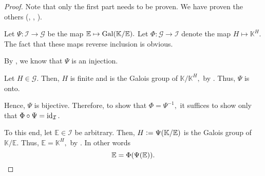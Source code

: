 \FTGT*\label{thm:FTGT2}
\begin{flushright}\hyperref[thm:FTGT]{\upsym}\end{flushright}
\begin{proof}
    Note that only the first part needs to be proven. We have proven the others (, , ).

    Let $\Psi : \mathcal{I} \to \mathcal{G}$ be the map $\mathbb{E} \mapsto \operatorname{Gal}(\mathbb{K}/\mathbb{E}).$ Let $\Phi : \mathcal{G} \to \mathcal{I}$ denote the map $H \mapsto \mathbb{K}^H.$ The fact that these maps reverse inclusion is obvious.

    By , we know that $\Psi$ is an injection.

    Let $H \in \mathcal{G}.$ Then, $H$ is finite and is the Galois group of $\mathbb{K}/\mathbb{K}^H,$ by . Thus, $\Psi$ is onto.

    Hence, $\Psi$ is bijective. Therefore, to show that $\Phi = \Psi^{-1},$ it suffices to show only that $\Phi \circ \Psi = \operatorname{id}_{\mathcal{I}}.$

    To this end, let $\mathbb{E} \in \mathcal{I}$ be arbitrary. Then, $H \vcentcolon= \Psi(\mathbb{K}/\mathbb{E})$ is the Galois group of $\mathbb{K}/\mathbb{E}.$ Thus, $\mathbb{E} = \mathbb{K}^H,$ by . In other words
    \begin{equation*} 
        \mathbb{E} = \Phi(\Psi(\mathbb{E})). \qedhere
    \end{equation*}
\end{proof}

